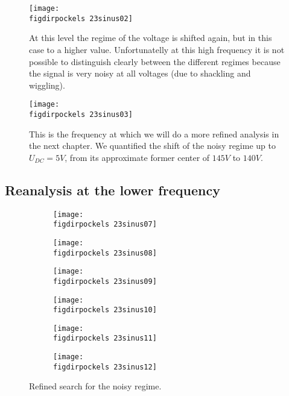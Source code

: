 \begin{figure}
    \texttt{[image: \\figdirpockels 23sinus02]}
    \caption{At this level the regime of the voltage is shifted
        again, but in this case to a higher value. Unfortunatelly
        at this high frequency it is not possible to distinguish
        clearly between the different regimes because the signal
        is very noisy at all voltages (due to shackling 
            and wiggling).}
\end{figure}

\begin{figure}
    \texttt{[image: \\figdirpockels 23sinus03]}
    \caption{This is the frequency at which we will do a more
        refined analysis in the next chapter. We quantified the
        shift of the noisy regime up to $U_{DC}=5V$, from
        its approximate former center of $145V$ to $140V$.}
\end{figure}
\clearpage
\subsection{Reanalysis at the lower frequency}
\begin{figure}
    \begin{subfigure}[b]{\picwidth}
        \texttt{[image: \\figdirpockels 23sinus07]}
        \caption{}
    \end{subfigure}\qquad
    \begin{subfigure}[b]{\picwidth}
        \texttt{[image: \\figdirpockels 23sinus08]}
        \caption{}
    \end{subfigure}
    \begin{subfigure}[b]{\picwidth}
        \texttt{[image: \\figdirpockels 23sinus09]}
        \caption{}
    \end{subfigure}
    \begin{subfigure}[b]{\picwidth}
        \texttt{[image: \\figdirpockels 23sinus10]}
        \caption{}
    \end{subfigure}
    \begin{subfigure}[b]{\picwidth}
        \texttt{[image: \\figdirpockels 23sinus11]}
        \caption{}
    \end{subfigure}
    \begin{subfigure}[b]{\picwidth}
        \texttt{[image: \\figdirpockels 23sinus12]}
        \caption{}
    \end{subfigure}
    \caption{Refined search for the noisy regime.}
    \label{fig:sinus5}
\end{figure}

